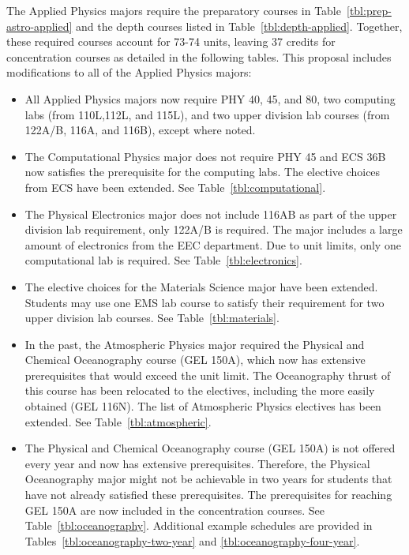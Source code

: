 \documentclass[12pt]{article}
\begin{document}
The Applied Physics majors require the preparatory courses in
Table~\ref{tbl:prep-astro-applied} and the depth courses listed in
Table~\ref{tbl:depth-applied}.  Together, these required courses
account for 73-74 units, leaving 37 credits for concentration courses
as detailed in the following tables.  This proposal includes
modifications to all of the Applied Physics majors:
\begin{itemize}

\item All Applied Physics majors now require PHY 40, 45, and 80, two computing labs (from 110L,112L, and 115L), and two upper division lab courses (from 122A/B, 116A, and 116B), except where noted.
  
\item The Computational Physics major does not require PHY 45 and ECS 36B now satisfies the prerequisite for the computing labs.  The elective choices from ECS have been extended.  See Table~\ref{tbl:computational}.

\item The Physical Electronics major does not include 116AB as part of the upper division lab requirement, only 122A/B is required.  The major includes a large amount of electronics from the EEC department.  Due to unit limits, only one computational lab is required.  See Table~\ref{tbl:electronics}.

\item The elective choices for the Materials Science major have been extended.  Students may use one EMS lab course to satisfy their requirement for two upper division lab courses.  See Table~\ref{tbl:materials}.

\item In the past, the Atmospheric Physics major required the Physical
  and Chemical Oceanography course (GEL 150A), which now has extensive
  prerequisites that would exceed the unit limit.  The Oceanography
  thrust of this course has been relocated to the electives, including
  the more easily obtained (GEL 116N).  The list of Atmospheric
  Physics electives has been extended.  See
  Table~\ref{tbl:atmospheric}.

\item The Physical and Chemical Oceanography course (GEL 150A) is not
  offered every year and now has extensive prerequisites.  Therefore,
  the Physical Oceanography major might not be achievable in two years
  for students that have not already satisfied these prerequisites.
  The prerequisites for reaching GEL 150A are now included in the
  concentration courses.  See Table~\ref{tbl:oceanography}.
  Additional example schedules are provided in
  Tables~\ref{tbl:oceanography-two-year} and
  \ref{tbl:oceanography-four-year}.
  

\end{itemize}
\end{document}
